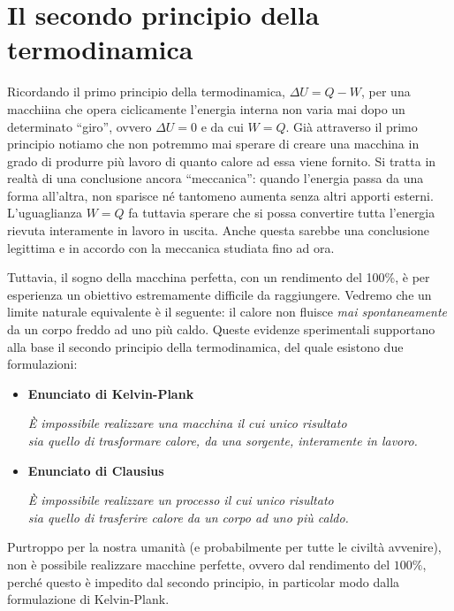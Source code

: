 \section*{Il secondo principio della termodinamica}
Ricordando il primo principio della termodinamica, $\Delta U = Q - W$,
per una macchiina che opera ciclicamente l'energia interna
non varia mai dopo un determinato ``giro'', ovvero $\Delta U = 0$
e da cui $W = Q$. Già attraverso il primo principio
notiamo che non potremmo mai sperare di creare una
macchina in grado di produrre più lavoro di quanto calore
ad essa viene fornito. Si tratta in realtà di una conclusione
ancora ``meccanica'': quando l'energia passa da una forma
all'altra, non sparisce né tantomeno aumenta senza
altri apporti esterni. L'uguaglianza $W = Q$ fa tuttavia
sperare che si possa convertire tutta l'energia rievuta
interamente in lavoro in uscita. Anche questa sarebbe
una conclusione legittima e in accordo con la meccanica
studiata fino ad ora.

Tuttavia, il sogno della macchina perfetta, con un
rendimento del 100\%, è per esperienza un obiettivo
estremamente difficile da raggiungere. Vedremo che
un limite naturale equivalente è il seguente: il calore
non fluisce \textit{mai spontaneamente} da un corpo
freddo ad uno più caldo. Queste evidenze sperimentali
supportano alla base il secondo principio della termodinamica,
del quale esistono due formulazioni:

\begin{itemize}
    \item \textbf{Enunciato di Kelvin-Plank}
    
    \begin{center}
        \textit{È impossibile realizzare una macchina il cui unico risultato\\
        sia quello di trasformare calore, da una sorgente, interamente in lavoro.}
    \end{center}

    \item \textbf{Enunciato di Clausius}
    
    \begin{center}
        \textit{È impossibile realizzare un processo il cui unico risultato\\
        sia quello di trasferire calore da un corpo ad uno più caldo.}
    \end{center}
\end{itemize}


\noindent Purtroppo per la nostra umanità (e probabilmente per tutte le civiltà avvenire),
non è possibile realizzare macchine perfette, ovvero dal rendimento del
$100\%$, perché questo è impedito dal secondo principio, in particolar modo
dalla formulazione di Kelvin-Plank.

